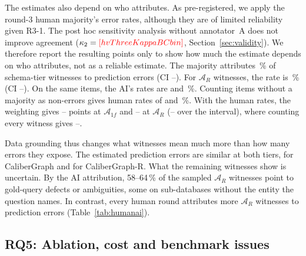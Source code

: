 The estimates also depend on who attributes. As pre-registered, we apply the round-3 human majority's error rates, although they are of limited reliability given R3-1. The post hoc sensitivity analysis without annotator~A does not improve agreement ($\kappa_2=\V{hvThreeKappaBCbin}$, Section~\ref{sec:validity}). We therefore report the resulting points only to show how much the estimate depends on who attributes, not as a reliable estimate. The majority attributes \,\% of schema-tier witnesses to prediction errors (CI --). For $\mathcal A_R$ witnesses, the rate is \,\% (CI --). On the same items, the AI's rates are  and \,\%. Counting items without a majority as non-errors gives human rates of  and \,\%. With the human rates, the weighting gives -- points at $\mathcal A_{1f}$ and -- at $\mathcal A_R$ (-- over the interval), where counting every witness gives --.

Data grounding thus changes what witnesses mean much more than how many errors they expose. The estimated prediction errors are similar at both tiers,  for CaliberGraph and  for CaliberGraph-R. What the remaining witnesses show is uncertain. By the AI attribution, 58--64\,\% of the sampled $\mathcal A_R$ witnesses point to gold-query defects or ambiguities, some on sub-databases without the entity the question names. In contrast, every human round attributes more $\mathcal A_R$ witnesses to prediction errors (Table~\ref{tab:humanai}).


\subsection{RQ5: Ablation, cost and benchmark issues}\label{sec:ablation}

